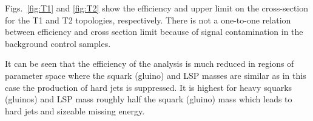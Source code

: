


Figs.~\ref{fig:T1} and \ref{fig:T2} show the efficiency and upper
limit on the cross-section for the T1 and T2 topologies, respectively.
There is not a one-to-one relation between efficiency and cross
section limit because of signal contamination in the background
control samples.

It can be seen that the efficiency of the analysis is much reduced in
regions of parameter space where the squark (gluino) and LSP masses 
are similar as in this case the production of hard jets is suppressed. 
It is highest for heavy squarks (gluinos) and LSP mass roughly half
the squark (gluino) mass which leads to hard jets and sizeable missing
energy.


